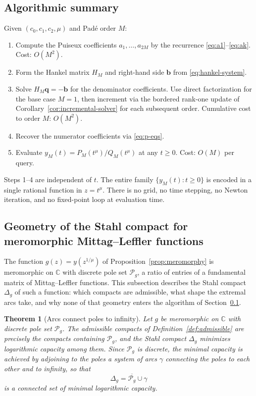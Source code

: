 \documentclass[11pt]{article}
\newtheorem{theorem}{Theorem}[section]
\theoremstyle{definition}
\theoremstyle{remark}
\begin{document}
\subsection{Algorithmic summary}
\label{sec:heston-algorithm}

Given $(c_{0},c_{1},c_{2},\mu)$ and Pad\'e order $M$:
\begin{enumerate}
\item Compute the Puiseux coefficients $a_{1},\dots,a_{2M}$ by the recurrence \eqref{eq:a1}--\eqref{eq:ak}. Cost: $O(M^{2})$.
\item Form the Hankel matrix $H_{M}$ and right-hand side $\bm{b}$ from \eqref{eq:hankel-system}.
\item Solve $H_{M}\bm{q}=-\bm{b}$ for the denominator coefficients. Use direct factorization for the base case $M=1$, then increment via the bordered rank-one update of Corollary~\ref{cor:incremental-solver} for each subsequent order. Cumulative cost to order $M$: $O(M^{2})$.
\item Recover the numerator coefficients via \eqref{eq:p-eqs}.
\item Evaluate $y_{M}(t)=P_{M}(t^{\mu})/Q_{M}(t^{\mu})$ at any $t\ge 0$. Cost: $O(M)$ per query.
\end{enumerate}
Steps 1--4 are independent of $t$. The entire family $\{y_{M}(t):t\ge 0\}$ is encoded in a single rational function in $z=t^{\mu}$. There is no grid, no time stepping, no Newton iteration, and no fixed-point loop at evaluation time.

\subsection{Geometry of the Stahl compact for meromorphic Mittag--Leffler functions}
\label{sec:heston-stahl-geometry}

The function $g(z)=y(z^{1/\mu})$ of Proposition~\ref{prop:meromorphy} is meromorphic on $\mathbb{C}$ with discrete pole set $\mathcal{P}_{g}$, a ratio of entries of a fundamental matrix of Mittag--Leffler functions. This subsection describes the Stahl compact $\Delta_{g}$ of such a function: which compacts are admissible, what shape the extremal arcs take, and why none of that geometry enters the algorithm of Section~\ref{sec:heston-algorithm}.

\begin{theorem}[Arcs connect poles to infinity]
\label{thm:arcs-to-infinity}
Let $g$ be meromorphic on $\mathbb{C}$ with discrete pole set $\mathcal{P}_{g}$. The admissible compacts of Definition~\ref{def:admissible} are precisely the compacts containing $\mathcal{P}_{g}$, and the Stahl compact $\Delta_{g}$ minimizes logarithmic capacity among them. Since $\mathcal{P}_{g}$ is discrete, the minimal capacity is achieved by adjoining to the poles a system of arcs $\gamma$ connecting the poles to each other and to infinity, so that
\begin{equation}
\Delta_{g}=\overline{\mathcal{P}_{g}}\cup\gamma
\label{eq:stahl-compact-structure}
\end{equation}
is a connected set of minimal logarithmic capacity.
\end{theorem}
\end{document}
